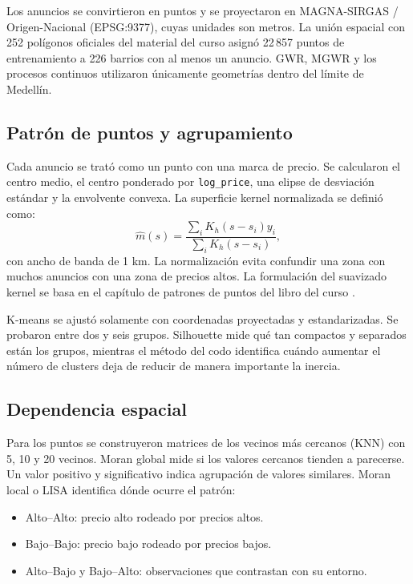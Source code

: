\documentclass[conference]{IEEEtran}
\begin{document}
Los anuncios se convirtieron en puntos y se proyectaron en MAGNA-SIRGAS / Origen-Nacional (EPSG:9377), cuyas unidades son metros. La unión espacial con 252 polígonos oficiales del material del curso asignó 22\,857 puntos de entrenamiento a 226 barrios con al menos un anuncio. GWR, MGWR y los procesos continuos utilizaron únicamente geometrías dentro del límite de Medellín.

\subsection{Patrón de puntos y agrupamiento}

Cada anuncio se trató como un punto con una marca de precio. Se calcularon el centro medio, el centro ponderado por \texttt{log\_price}, una elipse de desviación estándar y la envolvente convexa. La superficie kernel normalizada se definió como:
\begin{equation*}
    \widehat{m}(s)=
    \frac{\sum_i K_h(s-s_i)y_i}
         {\sum_i K_h(s-s_i)},
\end{equation*}
con ancho de banda de 1 km. La normalización evita confundir una zona con muchos anuncios con una zona de precios altos.
La formulación del suavizado kernel se basa en el capítulo de patrones de puntos del libro del curso \cite{librocurso}.

K-means se ajustó solamente con coordenadas proyectadas y estandarizadas. Se probaron entre dos y seis grupos. Silhouette mide qué tan compactos y separados están los grupos, mientras el método del codo identifica cuándo aumentar el número de clusters deja de reducir de manera importante la inercia.

\subsection{Dependencia espacial}

Para los puntos se construyeron matrices de los vecinos más cercanos (KNN) con 5, 10 y 20 vecinos. Moran global mide si los valores cercanos tienden a parecerse. Un valor positivo y significativo indica agrupación de valores similares. Moran local o LISA identifica dónde ocurre el patrón:
\begin{itemize}
    \item Alto--Alto: precio alto rodeado por precios altos.
    \item Bajo--Bajo: precio bajo rodeado por precios bajos.
    \item Alto--Bajo y Bajo--Alto: observaciones que contrastan con su entorno.
\end{itemize}
\end{document}
